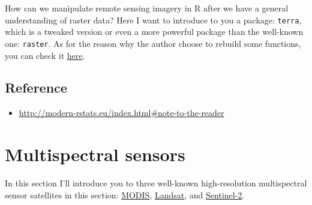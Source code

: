 \documentclass[
]{book}
\providecommand{\tightlist}{%
  \setlength{\itemsep}{0pt}\setlength{\parskip}{0pt}}
\begin{document}
How can we manipulate remote sensing imagery in R after we have a general understanding of raster data? Here I want to introduce to you a package: \texttt{terra}, which is a tweaked version or even a more powerful package than the well-known one: \texttt{raster}. As for the reason why the author choose to rebuild some functions, you can check it \href{http://www.wvview.org/os_sa/15_Raster_Analysis_terra.html}{here}.

\hypertarget{reference}{%
\section{Reference}\label{reference}}

\begin{itemize}
\tightlist
\item
  \url{http://modern-rstats.eu/index.html\#note-to-the-reader}
\end{itemize}

\hypertarget{multispectral-sensors}{%
\chapter{Multispectral sensors}\label{multispectral-sensors}}

In this section I'll introduce you to three well-known high-resolution multispectral sensor satellites in this section: \href{https://modis.gsfc.nasa.gov/}{MODIS}, \href{https://landsat.gsfc.nasa.gov/}{Landsat}, and \href{https://www.esa.int/Applications/Observing_the_Earth/Copernicus/Sentinel-2}{Sentinel-2}.

  
\end{document}
